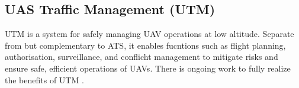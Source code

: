 \subsection{UAS Traffic Management (UTM)}

\Gls{UTM} is a system for safely managing \gls{UAV} operations at low altitude. 
Separate from but complementary to \gls{ATS}, it enables fucntions such as flight planning, authorisation, surveillance, and conflicht management to mitigate risks and ensure safe, efficient operations of \glspl{UAV}.
There is ongoing work to fully realize the benefits of \gls{UTM} \cite{faa_utm}.